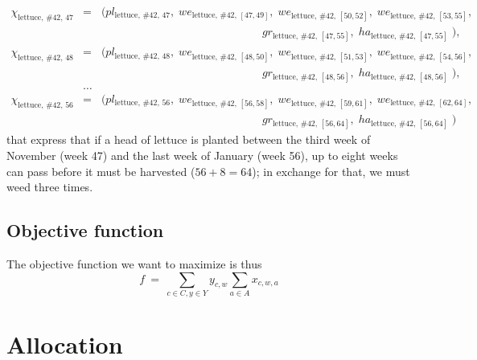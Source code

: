 \documentclass[11pt,reqno]{amsart}
\numberwithin{equation}{section}
\begin{document}
\begin{eqnarray*}
    \chi_{\text{lettuce},\, \text{\#42},\, 47} 
   &=& 
   \big(
      pl_{\text{lettuce},\, \text{\#42},\, 47}, \; 
      we_{\text{lettuce},\, \text{\#42},\, [47,49]}, \;
      we_{\text{lettuce},\, \text{\#42},\, [50,52]}, \;
      we_{\text{lettuce},\, \text{\#42},\, [53,55]}, 
   \\ && \hspace{6cm}
      gr_{\text{lettuce},\, \text{\#42},\, [47,55]}, \;
      ha_{\text{lettuce},\, \text{\#42},\, [47,55]} \;
      \big), \\
    \chi_{\text{lettuce},\, \text{\#42},\, 48} 
   &=& 
   \big(
      pl_{\text{lettuce},\, \text{\#42},\, 48}, \; 
      we_{\text{lettuce},\, \text{\#42},\, [48,50]}, \;
      we_{\text{lettuce},\, \text{\#42},\, [51,53]}, \;
      we_{\text{lettuce},\, \text{\#42},\, [54,56]}, 
   \\ && \hspace{6cm}
      gr_{\text{lettuce},\, \text{\#42},\, [48,56]}, \;
      ha_{\text{lettuce},\, \text{\#42},\, [48,56]} \;
      \big), \\
   &\dots& \\
   \chi_{\text{lettuce},\, \text{\#42},\, 56} 
   &=& 
   \big(
      pl_{\text{lettuce},\, \text{\#42},\, 56}, \; 
      we_{\text{lettuce},\, \text{\#42},\, [56,58]}, \;
      we_{\text{lettuce},\, \text{\#42},\, [59,61]}, \;
      we_{\text{lettuce},\, \text{\#42},\, [62,64]}, 
   \\ && \hspace{6cm}
      gr_{\text{lettuce},\, \text{\#42},\, [56,64]}, \;
      ha_{\text{lettuce},\, \text{\#42},\, [56,64]} \;
      \big)
\end{eqnarray*}
that express that if a head of lettuce is planted between the third week of November (week 47)
and the last week of January (week 56), up to eight weeks can pass before it must be
harvested ($56+8=64$); in exchange for that, we must weed three times. 


\subsection{Objective function}

The objective function we want to  maximize is thus
\[
   f 
   \ = \
   \sum_{c\in C, y\in Y} y_{c,w} \sum_{a\in A} x_{c,w,a}
\]


\section{Allocation}
\end{document}
